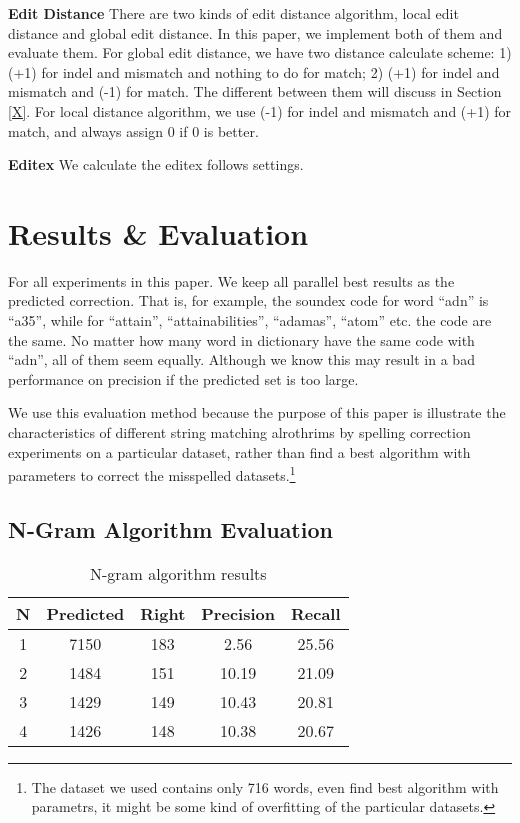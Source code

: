 \documentclass[11pt]{article}
\begin{document}
\noindent\textbf{Edit Distance} There are two kinds of edit distance algorithm, local edit distance and global edit distance. In this paper,  we implement both of them and evaluate them. For global edit distance, we have two distance calculate scheme: 1) (+1) for indel and mismatch and nothing to do for match; 2) (+1) for indel and mismatch and (-1) for match. The different between them will discuss in Section \ref{X}. For local distance algorithm, we use (-1) for indel and mismatch and (+1) for match, and always assign 0 if 0 is better.

\noindent\textbf{Editex} We calculate the editex follows  \cite{Zobel1996PhoneticSM} settings.
 
\section{Results \& Evaluation}

For all experiments in this paper. We keep all parallel best results as the predicted correction. That is, for example, the soundex code for word ``adn'' is ``a35'', while for ``attain'', ``attainabilities'', ``adamas'', ``atom'' etc. the code are the same. No matter how many word in dictionary have the same code with ``adn'', all of them seem equally. Although we know this may result in a bad performance on precision if the predicted set is too large. 

We use this evaluation method because the purpose of this paper is illustrate the characteristics of different string matching alrothrims by spelling correction experiments on a particular dataset, rather than find a best algorithm with parameters to correct the misspelled datasets.\footnote{The dataset we used contains only 716 words, even find best algorithm with parametrs, it might be some kind of overfitting of the particular datasets.} 

\subsection{N-Gram Algorithm Evaluation}

\begin{table}
	\centering
	\small
	\begin{tabular}{c|c|c|c|c}
		\hline
		N &Predicted & Right & Precision & Recall \\
		\hline
		1 & 7150 & 183 & 2.56 & 25.56 \\
		\hline
		2 & 1484 & 151 & 10.19 & 21.09  \\
		\hline
		3 & 1429 & 149 & 10.43 & 20.81 \\
		\hline
		4 & 1426 & 148 & 10.38 & 20.67 \\
		\hline
	\end{tabular}
	\caption{N-gram algorithm results}
	\label{tab:ngram}
\end{table}
\end{document}
